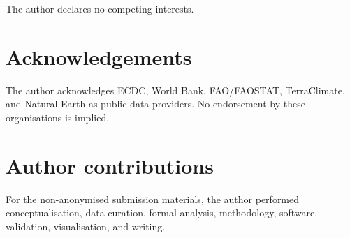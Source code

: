 \documentclass[11pt]{article}
\begin{document}
The author declares no competing interests.

\section*{Acknowledgements}

The author acknowledges ECDC, World Bank, FAO/FAOSTAT, TerraClimate, and Natural Earth as public data providers. No endorsement by these organisations is implied.

\section*{Author contributions}

For the non-anonymised submission materials, the author performed conceptualisation, data curation, formal analysis, methodology, software, validation, visualisation, and writing.

\FloatBarrier
\end{document}
